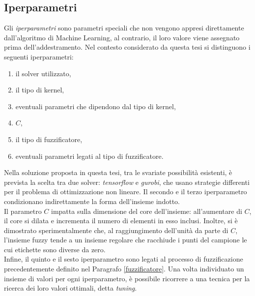 \documentclass[12pt]{report}
\theoremstyle{definition}
\begin{document}
\subsection{Iperparametri}\label{iperparameters}
Gli \textit{iperparametri} sono parametri speciali che non vengono appresi direttamente dall'algoritmo di Machine Learning, al contrario, il loro valore viene assegnato prima dell'addestramento.
Nel contesto considerato da questa tesi si distinguono i seguenti iperparametri: 
\begin{enumerate}
    \item il solver utilizzato,
    \item il tipo di kernel,
    \item eventuali parametri che dipendono dal tipo di kernel,
    \item $C$,
    \item il tipo di fuzzificatore,
    \item eventuali parametri legati al tipo di fuzzificatore.
\end{enumerate}
Nella soluzione proposta in questa tesi, tra le svariate possibilità esistenti, è prevista la scelta tra due solver: \textit{tensorflow} e \textit{gurobi}, che usano strategie differenti per il problema di ottimizzazione non lineare. Il secondo e il terzo iperparametro condizionano indirettamente la forma dell'insieme indotto.
\\
Il parametro $C$ impatta sulla dimensione del core dell'insieme:
all'aumentare di $C$, il core si dilata e incrementa il numero di elementi in esso inclusi.
Inoltre, si è dimostrato sperimentalmente che, al raggiungimento dell'unità da parte di $C$, l'insieme fuzzy tende a un insieme regolare che racchiude i punti del campione le cui etichette sono diverse da zero.
\\
Infine, il quinto e il sesto iperparametro sono legati al processo di fuzzificazione precedentemente definito nel Paragrafo \ref{fuzzificatore}.
Una volta individuato un insieme di valori per ogni iperparametro, è possibile ricorrere a una tecnica per la ricerca dei loro valori ottimali, detta \textit{tuning}.
\end{document}
